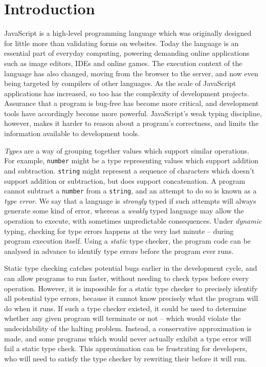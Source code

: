\documentclass[12pt,a4paper,twoside,openright]{report}
\begin{document}
\chapter{Introduction}\label{introduction}

JavaScript is a high-level programming language which was originally designed
for little more than validating forms on websites. Today the language is an
essential part of everyday computing, powering demanding online applications
such as image editors, IDEs and online games. The execution context of the
language has also changed, moving from the browser to the server, and now even
being targeted by compilers of other languages. As the scale of JavaScript
applications has increased, so too has the complexity of development projects.
Assurance that a program is bug-free has become more critical, and development
tools have accordingly become more powerful. JavaScript's weak typing
discipline, however, makes it harder to reason about a program's correctness,
and limits the information available to development tools.

\textit{Types} are a way of grouping together values which support similar
operations. For example, \texttt{number} might be a type representing values
which support addition and subtraction. \texttt{string} might represent a
sequence of characters which doesn't support addition or subtraction, but does
support concatenation. A program cannot subtract a \texttt{number} from a
\texttt{string}, and an attempt to do so is known as a \textit{type error}. We
say that a language is \textit{strongly} typed if such attempts will always
generate some kind of error, whereas a \textit{weakly} typed language may allow
the operation to execute, with sometimes unpredictable consequences. Under
\textit{dynamic} typing, checking for type errors happens at the very last
minute -- during program execution itself. Using a \textit{static} type %
checker, the program code can be analysed in advance to identify type errors
before the program ever runs.

Static type checking catches potential bugs earlier in the development cycle,
and can allow programs to run faster, without needing to check types before
every operation. However, it is impossible for a static type checker to
precisely identify all potential type errors, because it cannot know precisely
what the program will do when it runs. If such a type checker existed, it could
be used to determine whether any given program will terminate or not -- which %
would violate the undecidability of the halting problem. Instead, a
conservative approximation is made, and some programs which would never
actually exhibit a type error will fail a static type check. This approximation
can be frustrating for developers, who will need to satisfy the type checker by
rewriting their before it will run.
\end{document}
